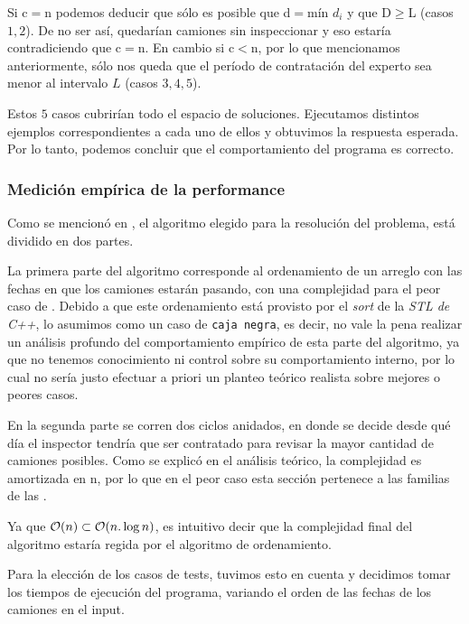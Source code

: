 \documentclass[11pt, a4paper, twoside]{article}
\begin{document}
Si c$=$n podemos deducir que sólo es posible que d$=$mín $d_i$ y que D$\ge$L
(casos $1,2$). De no ser así, quedarían camiones sin inspeccionar y eso estaría
contradiciendo que c$=$n. En cambio si c$<$n, por lo que mencionamos
anteriormente, sólo nos queda que el período de contratación del experto sea
menor al intervalo $L$ (casos $3,4,5$).


Estos $5$ casos cubrirían todo el espacio de soluciones. Ejecutamos distintos
ejemplos correspondientes a cada uno de ellos y obtuvimos la respuesta esperada.
Por lo tanto, podemos concluir que el comportamiento del programa es correcto.

\subsubsection{Medición empírica de la performance}

Como se mencionó en , el algoritmo elegido para la
resolución del problema, está dividido en dos partes. 

La primera parte del algoritmo corresponde al ordenamiento de un arreglo con las
fechas en que los camiones estarán pasando, con una complejidad para el peor
caso de . Debido a que este ordenamiento está provisto por el
\textit{sort} de la \textit{STL de C++}, lo asumimos como un caso de
\texttt{caja negra}, es decir, no vale la pena realizar un análisis profundo del
comportamiento empírico de esta parte del algoritmo, ya que no tenemos
conocimiento ni control sobre su comportamiento interno, por lo cual no sería
justo efectuar a priori un planteo teórico realista sobre mejores o peores
casos.

En la segunda parte se corren dos ciclos anidados, en donde se decide desde qué
día el inspector tendría que ser contratado para revisar la mayor cantidad de
camiones posibles. Como se explicó en el análisis teórico, la complejidad es
amortizada en n, por lo que en el peor caso esta sección pertenece a las
familias de las .

\begin{comment} 
Complejidad Amortizada: Tarjan 
\end{comment} 


Ya que $\mathop{}\mathopen{}\mathcal{O}\mathopen{}\left(n\right) \subset \mathop{}\mathopen{}\mathcal{O}\mathopen{}\left(n.\log{n}\right)$, es intuitivo decir que la
complejidad final del algoritmo estaría regida por el algoritmo de ordenamiento.

Para la elección de los casos de tests, tuvimos esto en cuenta y decidimos tomar
los tiempos de ejecución del programa, variando el orden de las fechas de los
camiones en el input.
\end{document}
